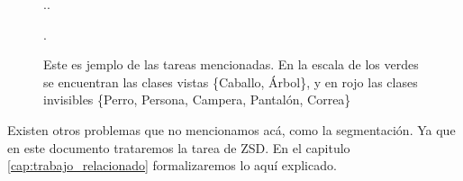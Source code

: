 \begin{figure}[H]..
  \centering
  \hspace{1em}%
  \caption{Este es jemplo de las tareas mencionadas. En la escala de los verdes se encuentran las clases vistas \{Caballo, Árbol\}, y en rojo las clases invisibles \{Perro, Persona, Campera, Pantalón, Correa\}}.\
  \label{fig:DetectoresYSZD}
\end{figure}

Existen otros problemas que no mencionamos acá, como la segmentación. Ya que en este documento trataremos la tarea de ZSD. En el capitulo \autoref{cap:trabajo_relacionado} formalizaremos lo aquí explicado.

